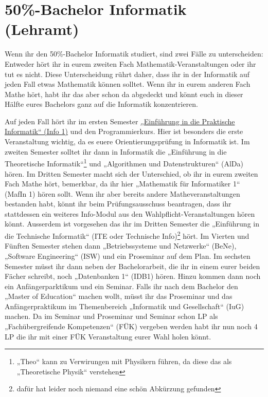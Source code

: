 \section{50\%-Bachelor Informatik (Lehramt)}

Wenn ihr den 50\%-Bachelor Informatik studiert, sind zwei Fälle zu unterscheiden: Entweder hört ihr in eurem zweiten Fach Ma\-the\-ma\-tik-Ver\-an\-stal\-tun\-gen oder ihr tut es nicht. Diese Unterscheidung rührt daher, dass ihr in der Informatik auf jeden Fall etwas Mathematik können solltet. Wenn ihr in eurem anderen Fach Mathe hört, habt ihr das aber schon da abgedeckt und könnt euch in dieser Hälfte eures Bachelors ganz auf die Informatik konzentrieren.

Auf jeden Fall hört ihr im ersten Semester \hyperref[info1]{„Einführung in die Praktische Informatik“ (Info 1)} und den Programmierkurs. Hier ist besonders die erste Veranstaltung wichtig, da es euere Orientierungsprüfung in Informatik ist. Im zweiten Semester solltet ihr dann in Informatik die „Einführung in die Theoretische Informatik“\footnote{„Theo“ kann zu Verwirungen mit Physikern führen, da diese das als „Theoretische Physik“ verstehen} und „Algorithmen und Datenstrukturen“ (AlDa) hören. Im Dritten Semester macht sich der Unterschied, ob ihr in eurem zweiten Fach Mathe hört, bemerkbar, da ihr hier „Mathematik für Informatiker 1“ (MafIn 1) hören sollt. Wenn ihr aber bereits andere Matheveranstaltungen bestanden habt, könnt ihr beim Prüfungsausschuss beantragen, dass ihr stattdessen ein weiteres Info-Modul aus den Wahlpflicht-Veranstaltungen hören könnt. Ausserdem ist vorgesehen das ihr im Dritten Semester die „Einführung in die Technische Informatik“ (ITE oder Technische Info)\footnote{dafür hat leider noch niemand eine schön Abkürzung gefunden} hört. Im Vierten und Fünften Semester stehen dann „Betriebssysteme und Netzwerke“ (BeNe), „Software Engineering“ (ISW) und ein Proseminar auf dem Plan. Im sechsten Semester müsst ihr dann neben der Bachelorarbeit, die ihr in einem eurer beiden Fächer schreibt, noch „Datenbanken 1“ (IDB1) hören. Hinzu kommen dann noch ein Anfängerparktikum und ein Seminar. Falls ihr nach dem Bachelor den „Master of Education“ machen wollt, müsst ihr das Proseminar und das Anfängerpraktikum im Themenbereich „Informatik und Gesellschaft“ (IuG) machen. Da im Seminar und Proseminar und Seminar schon \gls{LP} als „Fachübergreifende Kompetenzen“ (FÜK) vergeben werden habt ihr nun noch 4 \gls{LP} die ihr mit einer FÜK Veranstaltung eurer Wahl holen könnt.

